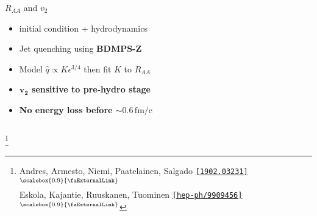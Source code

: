 \documentclass[aspectratio=169,11pt,usenames,dvipsnames]{beamer}
\renewcommand{\thefootnote}{\color{customblue}\faPaperPlaneO}
\newcommand\blfootnote[1]{%
  \begingroup
  \renewcommand\thefootnote{}\footnote{#1}%
  \addtocounter{footnote}{-1}%
  \endgroup
}
\begin{document}
\begin{frame}[t]
\begin{columns}[onlytextwidth,t]
\begin{center}
            {\Large\color{palgold} $R_{AA}$ and $v_2$  \\[10pt]}
            \footnotesize
                \begin{itemize}
                    \item { initial condition + hydrodynamics}
                    \item {\color{lightgray}Jet quenching using {\bfseries BDMPS-Z}}
                    \item {\color{lightgray}Model $\hat{q}\propto K \epsilon^{3/4}$ then fit $K$ to $R_{AA}$}\\[15pt]
                    \item {\color{destacado}\bfseries\normalsize{$\boldsymbol{v_2}$ sensitive to pre-hydro stage}}
                    \item {\color{destacado}\bfseries\normalsize{No energy loss before $\boldsymbol{\sim 0.6\,\mathrm{fm/c}}$}}
                \end{itemize}
        \end{center}
    \end{columns}
    \blfootnote{\scriptsize Andres, Armesto, Niemi, Paatelainen, Salgado \href{https://arxiv.org/abs/1902.03231}{\color{palgold}\texttt{[1902.03231]}$^\text{\scalebox{0.9}{\faExternalLink}}$}\\\hspace{14pt} Eskola, Kajantie, Ruuskanen, Tuominen \href{https://arxiv.org/abs/hep-ph/9909456}{\color{palviolet}\texttt{[hep-ph/9909456]}$^\text{\scalebox{0.9}{\faExternalLink}}$}}
\end{frame}

\end{document}
